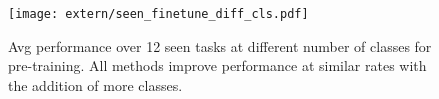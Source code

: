 \begin{figure}[h]
    \centering
    \texttt{[image: extern/seen\_finetune\_diff\_cls.pdf]}
  \vspace{-4mm}
    \caption{Avg performance over 12 seen tasks at different number of classes for pre-training. All methods improve performance at similar rates with the addition of more classes.}
    \label{fig:diff_num_cls} \vspace{-2mm}
\end{figure}